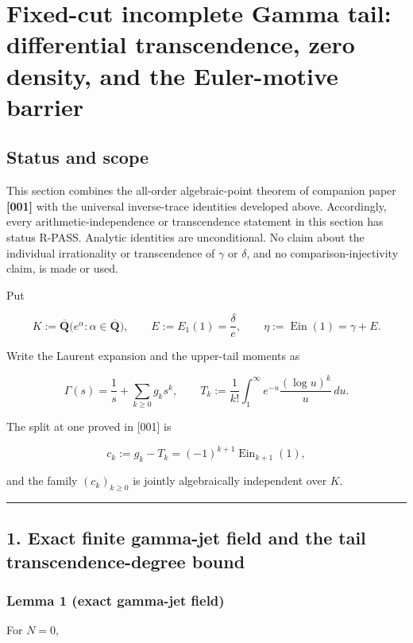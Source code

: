 \documentclass[11pt]{article}
\theoremstyle{keio}
\theoremstyle{definition}
\theoremstyle{remark}
\newcommand{\Ein}{\operatorname{Ein}}
\newcommand{\RPASS}{\textcolor{keioxblue}{\textsf{R-PASS}}}
\begin{document}
\section{Fixed-cut incomplete Gamma tail: differential transcendence, zero density, and the Euler-motive barrier}

\subsection{Status and scope}

This section combines the all-order algebraic-point theorem of companion
paper \textbf{[001]} with the universal inverse-trace identities developed
above.  Accordingly, every arithmetic-independence or transcendence statement
in this section has status \RPASS{}.  Analytic identities are unconditional.
No claim about the individual irrationality or transcendence of \(\gamma\)
or \(\delta\), and no comparison-injectivity claim, is made or used.

Put

\[
 K:=\overline{\mathbf Q}\bigl(e^\alpha:\alpha\in\overline{\mathbf Q}\bigr),
 \qquad E:=E_1(1)=\frac{\delta}{e},
 \qquad \eta:=\Ein(1)=\gamma+E .
\]

Write the Laurent expansion and the upper-tail moments as

\[
 \Gamma(s)=\frac1s+\sum_{k\ge0}g_ks^k,
 \qquad
 T_k:=\frac1{k!}\int_1^\infty e^{-u}\frac{(\log u)^k}{u}\,du .
\]

The split at one proved in {[}001{]} is

\[
 c_k:=g_k-T_k=(-1)^{k+1}\Ein_{k+1}(1),                         \tag{GT-1}
\]

and the family \((c_k)_{k\ge0}\) is jointly algebraically independent over \(K\).

\begin{center}\rule{0.5\linewidth}{0.5pt}\end{center}

\subsection{1. Exact finite gamma-jet field and the tail transcendence-degree bound}

\subsubsection{Lemma 1 (exact gamma-jet field)}

For \(N=0\),
\end{document}
